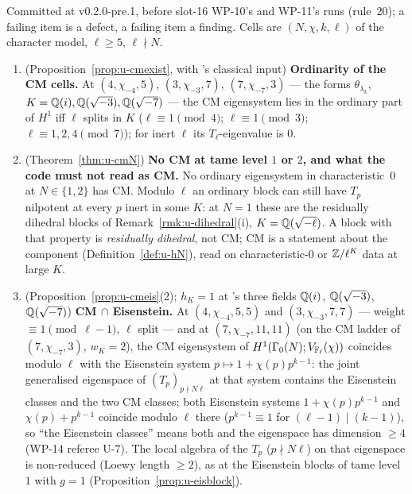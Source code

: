 \documentclass[11pt]{article}
\begin{document}
\begin{remark}\label{rmk:u-pred2}
Committed at v0.2.0-pre.1, before slot-16 WP-10's and WP-11's runs (rule~20); a failing \PROVED{} item is a defect, a failing \CONJ{} item a finding. Cells are
$(N,\chi,k,\ell)$ of the character model, $\ell\ge5$, $\ell\nmid N$.
\begin{enumerate}[label=(U\arabic*),start=8]
\item\label{U8} \PROVED{} (Proposition~\ref{prop:u-cmexist}, with 's classical input) \textbf{Ordinarity of the CM cells.} At $(4,\chi_{-4},5)$, $(3,\chi_{-3},7)$,
  $(7,\chi_{-7},3)$ --- the forms $\theta_{\lambda_k}$, $K=\mathbb{Q}(i),\mathbb{Q}(\sqrt{-3}),\mathbb{Q}(\sqrt{-7})$ --- the CM eigensystem lies in the ordinary part of $H^{1}$ iff $\ell$ splits in
  $K$ ($\ell\equiv1\pmod4$; $\ell\equiv1\pmod3$; $\ell\equiv1,2,4\pmod7$); for inert $\ell$ its $T_\ell$-eigenvalue is $0$.
\item\label{U9} \PROVED{} (Theorem~\ref{thm:u-cmN}) \textbf{No CM at tame level $1$ or $2$, and what the code must not read as CM.} No ordinary
  eigensystem in characteristic~$0$ at $N\in\{1,2\}$ has CM. Modulo $\ell$ an ordinary block can still have $T_p$ nilpotent at every $p$ inert in some $K$: at
  $N=1$ these are the residually dihedral blocks of Remark~\ref{rmk:u-dihedral}(i), $K=\mathbb{Q}(\sqrt{-\ell})$. A block with that property is \emph{residually
  dihedral}, not CM; CM is a statement about the component (Definition~\ref{def:u-hN}), read on characteristic-$0$ or $\mathbb{Z}/\ell^{K}$ data at large $K$.
\item\label{U10} \PROVED{} (Proposition~\ref{prop:u-cmeis}(2); $h_K=1$ at 's three fields $\mathbb{Q}(i)$, $\mathbb{Q}(\sqrt{-3})$, $\mathbb{Q}(\sqrt{-7})$) \textbf{CM $\cap$ Eisenstein.} At $(4,\chi_{-4},5,5)$ and $(3,\chi_{-3},7,7)$ --- weight $\equiv1\pmod{\ell-1}$,
  $\ell$ split --- and at $(7,\chi_{-7},11,11)$ (on the CM ladder of $(7,\chi_{-7},3)$, $w_K=2$), the CM eigensystem of $H^{1}(\Gamma_0(N);V_{\mathbb{F}_\ell}(\chi))$ coincides modulo
  $\ell$ with the Eisenstein system $p\mapsto1+\chi(p)p^{k-1}$: the joint generalised eigenspace of $(T_p)_{p\nmid N\ell}$ at that system contains the Eisenstein
  classes and the two CM classes; both Eisenstein systems $1+\chi(p)p^{k-1}$ and $\chi(p)+p^{k-1}$ coincide modulo $\ell$ there ($p^{k-1}\equiv1$ for $(\ell-1)\mid(k-1)$),
  so ``the Eisenstein classes'' means both and the eigenspace has dimension $\ge4$ (WP-14 referee U-7). \CONJ{} The local algebra of the $T_p$ ($p\nmid N\ell$) on that eigenspace is non-reduced (Loewy length $\ge2$), as at the
  Eisenstein blocks of tame level~$1$ with $g=1$ (Proposition~\ref{prop:u-eisblock}).
\end{enumerate}
\end{remark}
\end{document}
